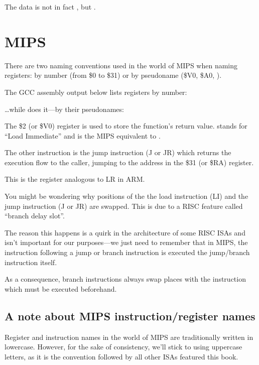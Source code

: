The data is not in fact , but .

\ifdefined\IncludeMIPS
\section{MIPS}

\label{MIPS_leaf_function_ex1}
There are two naming conventions used in the world of MIPS when naming registers: by number (from \$0 to \$31) or by pseudoname (\$V0, \$A0, \etc{}).

The GCC assembly output below lists registers by number:



\dots while \IDA does it---by their pseudonames:



The \$2 (or \$V0) register is used to store the function's return value.
 stands for ``Load Immediate'' and is the MIPS equivalent to \MOV.

The other instruction is the jump instruction (J or JR) which returns the execution flow to the \gls{caller}, jumping to the address in the \$31 (or \$RA) register.

This is the register analogous to \ac{LR} in ARM.

You might be wondering why positions of the the load instruction (LI) and the jump instruction (J or JR) are swapped. This is due to a \ac{RISC} feature called ``branch delay slot''.

The reason this happens is a quirk in the architecture of some RISC \ac{ISA}s and isn't important for our purposes---we just need to remember that in MIPS, the instruction following a jump or branch instruction
is executed  the jump/branch instruction itself.

As a consequence, branch instructions always swap places with the instruction which must be executed beforehand.

\subsection{A note about MIPS instruction/register names}

Register and instruction names in the world of MIPS are traditionally written in lowercase.
However, for the sake of consistency, we'll stick to using uppercase letters,
as it is the convention followed by all other \ac{ISA}s featured this book.

\fi %

